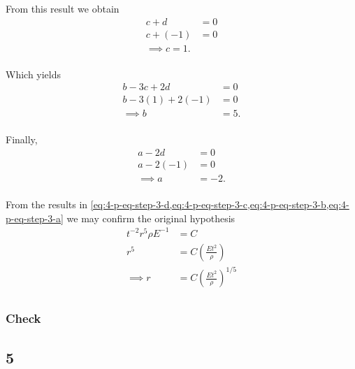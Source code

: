 \documentclass[12pt]{article}
\begin{document}
  From this result we obtain
  \begin{equation}
    \label{eq:4-p-eq-step-3-c}
    \begin{aligned}
      c+d &= 0 \\
      c + (-1) &= 0 \\
      \implies c = 1. \\
    \end{aligned}
  \end{equation}

  Which yields
  \begin{equation}
    \label{eq:4-p-eq-step-3-b}
    \begin{aligned}
      b - 3c + 2d &= 0 \\
      b - 3(1) + 2(-1) &= 0 \\
      \implies b &= 5. \\
    \end{aligned}
  \end{equation}

  Finally,
  \begin{equation}
    \label{eq:4-p-eq-step-3-a}
    \begin{aligned}
      a - 2d &= 0 \\
      a - 2(-1) &= 0 \\
      \implies a &= -2. \\
    \end{aligned}
  \end{equation}

  From the results in
  \cref{eq:4-p-eq-step-3-d,eq:4-p-eq-step-3-c,eq:4-p-eq-step-3-b,eq:4-p-eq-step-3-a}
  we may confirm the original hypothesis
  \begin{equation} \boxed{
    \begin{aligned}
      t^{-2} r^{5} \rho E^{-1} &= C \\
      r^5 &= C\left(\frac{Et^2}{\rho}\right) \\
      \implies r &= C\left(\frac{Et^2}{\rho}\right)^{1/5} \\
    \end{aligned}
    }
  \end{equation}

  \subsubsection*{Check}
  \todo

\subsection{5}
\end{document}
